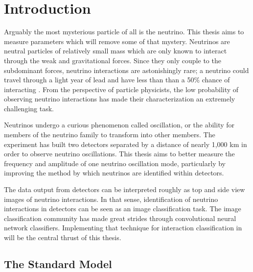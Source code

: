 \chapter{Introduction}
\label{intro_chapter}


Arguably the most mysterious particle of all is the neutrino.
This thesis aims to measure parameters which will remove some of that mystery.
Neutrinos are neutral particles of relatively small mass which are only
known to interact through the weak and gravitational forces.
Since they only couple to the subdominant forces, neutrino interactions are
astonishingly rare; a neutrino could travel through a light year of lead and
have less than than a 50\% chance of interacting \cite{petit2013heart}.
From the perspective of particle
physicists, the low probability of observing neutrino interactions has made
their characterization an extremely challenging task.

Neutrinos undergo a curious phenomenon called oscillation, or the ability for
members of the neutrino family to transform into other members.  The \nova
experiment has built two detectors separated by a distance of nearly 1,000 km
in order to observe neutrino oscillations.  This thesis aims to better measure
the frequency and amplitude of one neutrino oscillation mode, particularly by
improving the
method by which neutrinos are identified within \nova detectors.


The data output from \nova detectors can be interpreted roughly as top and side
view images of neutrino interactions.  In that sense, identification of
neutrino interactions in \nova detectors can be seen as an image classification
task.  The image classification community has made great strides through
convolutional neural network classifiers.  Implementing that technique for
interaction classification in \nova will be the central thrust of this thesis.



\section{The Standard Model}

